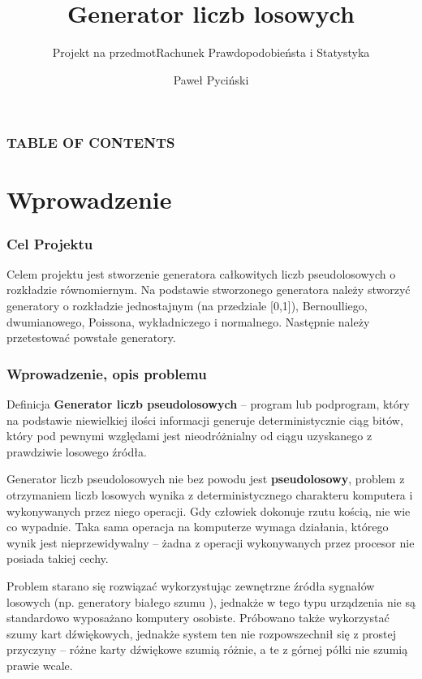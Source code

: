 \documentclass[9pt]{beamer}
\title{Generator liczb losowych}
\subtitle{Projekt na przedmot}
\subtitle{Rachunek Prawdopodobieństa i Statystyka}
\author{Paweł Pyciński}
\institute{Uniwersytet Jagielloński}
\begin{document}
\titlepage

\begin{frame}

 \frametitle{TABLE OF CONTENTS}
 \tableofcontents
\end{frame}

\section{Wprowadzenie}
\begin{frame}
  \frametitle{Cel Projektu}
  Celem projektu jest stworzenie generatora całkowitych liczb pseudolosowych o rozkładzie równomiernym. Na podstawie stworzonego generatora należy stworzyć generatory o rozkładzie jednostajnym (na przedziale [0,1]), Bernoulliego, dwumianowego, Poissona, wykładniczego i normalnego. Następnie należy przetestować powstałe generatory.
\end{frame}
\begin{frame}
  \frametitle{Wprowadzenie, opis problemu}
  \begin{block}{Definicja}
    \textbf{Generator liczb pseudolosowych} – program lub podprogram, który na podstawie niewielkiej ilości informacji generuje deterministycznie ciąg bitów, który pod pewnymi względami jest nieodróżnialny od ciągu uzyskanego z prawdziwie losowego źródła.
    \end{block}

  Generator liczb pseudolosowych nie bez powodu jest \textbf{pseudolosowy}, problem z otrzymaniem liczb losowych wynika z deterministycznego charakteru komputera i wykonywanych przez niego operacji. Gdy człowiek dokonuje rzutu kością, nie wie co wypadnie. Taka sama operacja na komputerze wymaga działania, którego wynik jest nieprzewidywalny – żadna z operacji wykonywanych przez procesor nie posiada takiej cechy.

  Problem starano się rozwiązać wykorzystując zewnętrzne źródła sygnałów losowych (np. generatory białego szumu ), jednakże w tego typu urządzenia nie są standardowo wyposażano komputery osobiste. Próbowano także wykorzystać szumy kart dźwiękowych, jednakże system ten nie rozpowszechnił się z prostej przyczyny – różne karty dźwiękowe szumią różnie, a te z górnej półki nie szumią prawie wcale.
\end{frame}
\end{document}
